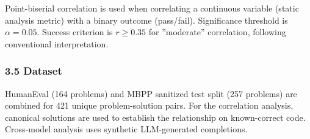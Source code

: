 Point-biserial correlation is used when correlating a continuous variable (static analysis metric) with a binary outcome (pass/fail). Significance threshold is $\alpha =0.05$. Success criterion is $r\geq 0.35$ for ''moderate'' correlation, following conventional interpretation.

\subsubsection{3.5 Dataset}

HumanEval (164 problems) and MBPP sanitized test split (257 problems) are combined for 421 unique problem-solution pairs. For the correlation analysis, canonical solutions are used to establish the relationship on known-correct code. Cross-model analysis uses synthetic LLM-generated completions.

